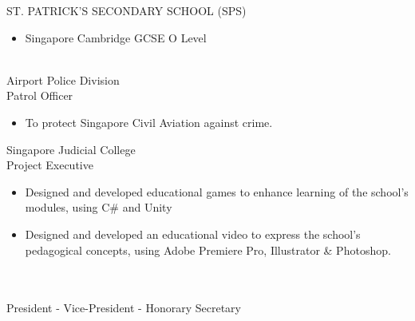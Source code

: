 \documentclass[a4paper,10pt]{article}
\begin{document}
\begin{paracol}{2}
\begin{rightcolumn}
      \normalsize\noindent\latobold ST. PATRICK'S SECONDARY SCHOOL (SPS) \hfill\small{}
      \begin{itemize}[left=0pt, labelsep=0.5em, itemsep=0pt, topsep=0pt, parsep=0pt, partopsep=0pt]
        \item \lato Singapore Cambridge GCSE O Level
      \end{itemize}
      \vspace{0.35cm}
      \Large\noindent{}
      \vspace{0.15cm}\\
      \normalsize{} \textbar{} Airport Police Division \hfill\small{}\\
      \latobold Patrol Officer
        \begin{itemize}[left=0pt, labelsep=0.5em, itemsep=0pt, topsep=0pt, parsep=0pt, partopsep=0pt]
          \item \lato To protect Singapore Civil Aviation against crime.
        \end{itemize}
      \vspace{0.35cm}
      \normalsize\noindent{} \textbar{} Singapore Judicial College \hfill\small{}\\
      \latobold Project Executive
        \begin{itemize}[left=0pt, labelsep=0.5em, itemsep=0pt, topsep=0pt, parsep=0pt, partopsep=0pt]
          \item \lato Designed and developed educational games to enhance learning of the school's modules, using C\# and Unity
          \item \lato Designed and developed an educational video to express the school's pedagogical concepts, using Adobe Premiere Pro, Illustrator \& Photoshop.
        \end{itemize}
      \vspace{0.35cm}
      \Large\noindent{}
      \vspace{0.15cm}\\
      \normalsize{} \hfill\small{}\\
      \latobold President - Vice-President - Honorary Secretary
      \begin{itemize}[left=0pt, labelsep=0.5em, itemsep=0pt, topsep=0pt, parsep=0pt, partopsep=0pt]

\end{itemize}
\end{rightcolumn}
\end{paracol}
\end{document}
